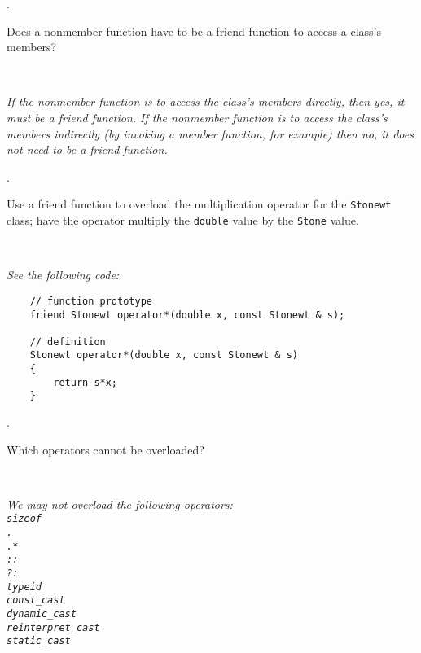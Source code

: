 \documentclass{amsart}
\begin{document}
. 
\begin{minipage}[t]{11.5 cm}
	Does a nonmember function have to be a friend function
	to access a class's members?
\end{minipage} \\[1ex]
\phantom{3. } 
\begin{minipage}[t]{11.5 cm}
	{\slshape 
	If the nonmember function is to access the class's members
	directly, then yes, it must be a friend function.
	If the nonmember function is to access the class's members
	indirectly (by invoking a member function, for example)
	then no, it does not need to be a friend function.
	} 
\end{minipage} 
\vfill

. 
\begin{minipage}[t]{11.5 cm}
	Use a friend function to overload the multiplication operator for the \texttt{Stonewt} class; have the operator multiply the \texttt{double} value by the \texttt{Stone} value.
\end{minipage} \\[1ex]
\phantom{2. } 
\begin{minipage}[t]{11.5 cm}
	{\slshape 
	See the following code:
	}
	\begin{verbatim}
	// function prototype
	friend Stonewt operator*(double x, const Stonewt & s);

	// definition
	Stonewt operator*(double x, const Stonewt & s)
	{
	    return s*x;
	}
	\end{verbatim}
\end{minipage} 
\vfill
\newpage

\phantom{\quad} 
\vfill
{}. 
\begin{minipage}[t]{11.5 cm}
	Which operators cannot be overloaded?
\end{minipage} \\[1ex]
\phantom{3. } 
\begin{minipage}[t]{11.5 cm}
	{\slshape 
	We may not overload the following operators: \\
	\verb+sizeof+ \\
	\verb+.+ \\
	\verb+.*+ \\
	\verb+::+ \\
	\verb+?:+ \\
	\verb+typeid+\\
	\verb+const_cast+\\
	\verb+dynamic_cast+\\
	\verb+reinterpret_cast+\\ 
	\verb+static_cast+
	} 
\end{minipage} 
\vfill
\end{document}
